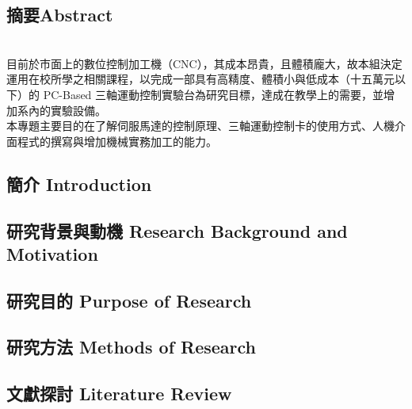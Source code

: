 \documentclass[14pt,a4paper]{report}  %
\newcommand{\twenty}{\fontsize{20pt}{\baselineskip}\selectfont}%
\newcommand{\sixteen}{\fontsize{16pt}{\baselineskip}\selectfont}%
\begin{document}
 \renewcommand{\contentsname}\bf \twenty{} %
 \tableofcontents
        \newpage
         {\begin{center}
        \chapter{摘要Abstract}
        \end{center}}
        {\begin{flushleft}
        \twenty {生產自動化是現今工業界中最重要的一環，如何以更低的成本與縮短生產製程，來提高在國際上的競爭力，是大家所努力的目標，而身為未來二十一世紀的一員，更需了解其重要性。}
        \sixteen\\{目前於市面上的數位控制加工機（CNC），其成本昂貴，且體積龐大，故本組決定運用在校所學之相關課程，以完成一部具有高精度、體積小與低成本（十五萬元以下）的 PC-Based 三軸運動控制實驗台為研究目標，達成在教學上的需要，並增加系內的實驗設備。}
        \sixteen\\{本專題主要目的在了解伺服馬達的控制原理、三軸運動控制卡的使用方式、人機介面程式的撰寫與增加機械實務加工的能力。}
        \end{flushleft}
        \newpage
{\begin{center}
     \chapter{簡介 Introduction}
     \end{center}}
     {\begin{center}
      \section{研究背景與動機 Research Background and Motivation}
      \section{研究目的 Purpose of Research}
      \section{研究方法 Methods of Research}
     \end{center}}
     \newpage

    {\begin{center}
        \chapter{文獻探討 Literature Review}
        \end{center}}
        {\begin{flushleft}
        \sixteen {內文內文內文123ABC}
        \end{flushleft}
        {\begin{center}

\end{center}}}}
\end{document}
